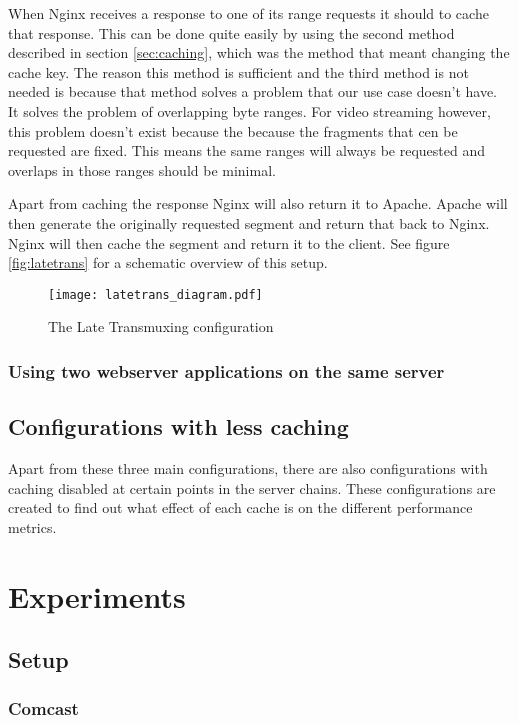 \documentclass[twoside,openright]{uva-bachelor-thesis}
\begin{document}
When Nginx receives a response to one of its range requests it should to
cache that response. This can be done quite easily by using the second method
described in section \ref{sec:caching}, which was the method that meant changing
the cache key. The reason this method is sufficient and the third method is not
needed is because that method solves a problem that our use case doesn't have.
It solves the problem of overlapping byte ranges. For video streaming however,
this problem doesn't exist because the because the fragments that cen be
requested are fixed. This means the same ranges will always be requested and
overlaps in those ranges should be minimal.

Apart from caching the response Nginx will also return it to Apache. Apache will
then generate the originally requested segment and return that back to Nginx.
Nginx will then cache the segment and return it to the client. See figure
\vref{fig:latetrans} for a schematic overview of this setup.

\begin{figure}
    \texttt{[image: latetrans\_diagram.pdf]}
    \caption{The Late Transmuxing configuration}
    \label{fig:latetrans}
\end{figure}

\subsection{Using two webserver applications on the same server}


\section{Configurations with less caching}
Apart from these three main configurations, there are also configurations
with caching disabled at certain points in the server chains. These
configurations are created to find out what effect of each cache is on the
different performance metrics.






\chapter{Experiments}
\section{Setup}
\subsection{Comcast}
\end{document}
